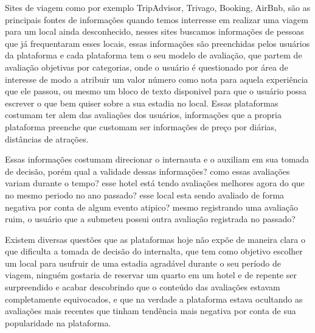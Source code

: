 Sites de viagem como por exemplo TripAdvisor, Trivago, Booking, AirBnb, são as principais fontes de informações quando temos interresse em realizar uma viagem para um local ainda desconhecido, nesses sites buscamos informações de pessoas que já frequentaram esses locais, essas informações são preenchidas pelos usuários da plataforma e cada plataforma tem o seu modelo de avaliação, que partem de avaliação objetivas por categorias, onde o usuário é questionado por área de interesse de modo a atribuir um valor número como nota para aquela experiência que ele passou, ou mesmo um bloco de texto disponivel para que o usuário possa escrever o que bem quiser sobre a sua estadia no local. Essas plataformas costumam ter alem das avaliações dos usuários, informações que a propria plataforma preenche que customam ser informações de preço por diárias, distâncias de atrações.

Essas informações costumam direcionar o internauta e o auxiliam em sua tomada de decisão, porém qual a validade dessas informações? como essas avaliações variam durante o tempo? esse hotel está tendo avaliações melhores agora do que no mesmo periodo no ano passado? esse local esta sendo avaliado de forma negativa por conta de algum evento atipico? mesmo registrando uma avaliação ruim, o usuário que a submeteu possui outra avaliação registrada no passado? 

Existem diversas questões que as plataformas hoje não expõe de maneira clara o que dificulta a tomada de decisão do internalta, que tem como objetivo escolher um local para usufruir de uma estadia agradável durante o seu período de viagem, ninguém gostaria de reservar um quarto em um hotel e de repente ser surpreendido e acabar descobrindo que o conteúdo das avaliações estavam completamente equivocados, e que na verdade a plataforma estava ocultando as avaliações mais recentes que tinham tendência mais negativa por conta de sua popularidade na plataforma.

\begin{comment}
O presente relatório está estruturado da seguinte forma: o capítulo~\ref{cap:justificativa} apresenta..., o capítulo~\ref{cap:fund_teorica}... O capítulo~\ref{cap:metodologia} ..., o capítulo~\ref{cap:resultados} .... O capítulo~\ref{cap:conclusao} 

Demonstração de citação: o software de análise foi desenvolvido na linguagem Python~\cite{van1995python}, usando as bibliotecas Pandas~\cite{mckinney2010data} e Scikit-learn~\cite{scikit-learn}.
\end{comment}

